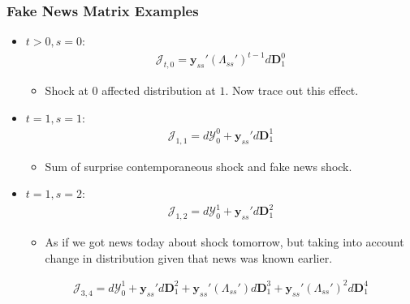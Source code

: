 \documentclass[english,xcolor=svgnames]{beamer}
\begin{document}
\begin{frame}
    \frametitle{Fake News Matrix Examples}
    \begin{itemize}
        \item $t>0,s=0$:
        \begin{align*}
        	\mathcal{J}_{t,0} = \bm{y}_{ss}'(\Lambda_{ss}')^{t-1} d\bm{D}_1^0
        \end{align*}
        \begin{itemize}
        	\item Shock at $0$ affected distribution at $1$. Now trace out this effect.
        \end{itemize}
       	\item $t=1,s=1$:
        \begin{align*}
        	\mathcal{J}_{1,1} = d\mathcal{Y}_0^0 + \bm{y}_{ss}' d\bm{D}_1^1
        \end{align*}
        \begin{itemize}
        	\item Sum of surprise contemporaneous shock and fake news shock.
        \end{itemize}
        \item $t=1,s=2$:
        \begin{align*}
        	\mathcal{J}_{1,2} = d\mathcal{Y}_0^1 + \bm{y}_{ss}' d\bm{D}_1^2
        \end{align*}
        \begin{itemize}
        	\item As if we got news today about shock tomorrow, but taking into account change in distribution given that news was known earlier.
        \end{itemize}
        \begin{align*}
        	\mathcal{J}_{3,4} = d\mathcal{Y}_0^1 + \bm{y}_{ss}'  d\bm{D}_1^2 + \bm{y}_{ss}' (\Lambda_{ss}') d\bm{D}_1^3 + \bm{y}_{ss}' (\Lambda_{ss}')^{2} d\bm{D}_1^4
        \end{align*}
	\end{itemize}
\end{frame}
\end{document}

